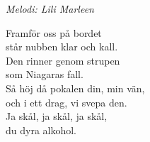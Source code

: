 {\footnotesize\textit{Melodi: Lili Marleen}}
\par
\vspace{10pt}
Framför oss på bordet\\
står nubben klar och kall.\\
Den rinner genom strupen\\
som Niagaras fall.\\
Så höj då pokalen din, min vän,\\
och i ett drag, vi svepa den.\\
Ja skål, ja skål, ja skål,\\
du dyra alkohol.
